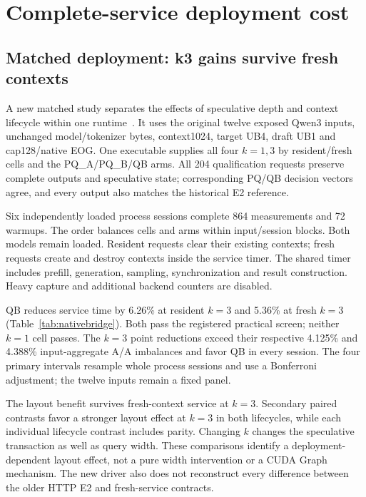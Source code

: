 \section{Complete-service deployment cost}
\label{sec:deployment}
\subsection{Matched deployment: k3 gains survive fresh contexts}
\label{sec:matchedbridge}
A new matched study separates the effects of speculative depth and context lifecycle within one runtime~\cite{rtxnativebridge}. It uses the original twelve exposed Qwen3 inputs, unchanged model/tokenizer bytes, context1024, target UB4, draft UB1 and cap128/native EOG. One executable supplies all four $k=1,3$ by resident/fresh cells and the PQ\_A/PQ\_B/QB arms. All 204 qualification requests preserve complete outputs and speculative state; corresponding PQ/QB decision vectors agree, and every output also matches the historical E2 reference.

Six independently loaded process sessions complete 864 measurements and 72 warmups. The order balances cells and arms within input/session blocks. Both models remain loaded. Resident requests clear their existing contexts; fresh requests create and destroy contexts inside the service timer. The shared timer includes prefill, generation, sampling, synchronization and result construction. Heavy capture and additional backend counters are disabled.



QB reduces service time by 6.26\% at resident $k=3$ and 5.36\% at fresh $k=3$ (Table~\ref{tab:nativebridge}). Both pass the registered practical screen; neither $k=1$ cell passes. The $k=3$ point reductions exceed their respective 4.125\% and 4.388\% input-aggregate A/A imbalances and favor QB in every session. The four primary intervals resample whole process sessions and use a Bonferroni adjustment; the twelve inputs remain a fixed panel.

The layout benefit survives fresh-context service at $k=3$. Secondary paired contrasts favor a stronger layout effect at $k=3$ in both lifecycles, while each individual lifecycle contrast includes parity. Changing $k$ changes the speculative transaction as well as query width. These comparisons identify a deployment-dependent layout effect, not a pure width intervention or a CUDA Graph mechanism. The new driver also does not reconstruct every difference between the older HTTP E2 and fresh-service contracts.

